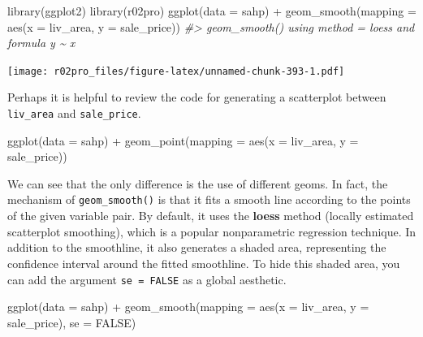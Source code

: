 \documentclass[
]{book}
\newenvironment{Shaded}{\begin{snugshade}}{\end{snugshade}}
\newcommand{\AttributeTok}[1]{\textcolor[rgb]{0.77,0.63,0.00}{#1}}
\newcommand{\CommentTok}[1]{\textcolor[rgb]{0.56,0.35,0.01}{\textit{#1}}}
\newcommand{\ConstantTok}[1]{\textcolor[rgb]{0.00,0.00,0.00}{#1}}
\newcommand{\FunctionTok}[1]{\textcolor[rgb]{0.00,0.00,0.00}{#1}}
\newcommand{\NormalTok}[1]{#1}
\newcommand{\SpecialCharTok}[1]{\textcolor[rgb]{0.00,0.00,0.00}{#1}}
\begin{document}
\begin{Shaded}
\begin{Highlighting}[]
\FunctionTok{library}\NormalTok{(ggplot2)}
\FunctionTok{library}\NormalTok{(r02pro)}
\FunctionTok{ggplot}\NormalTok{(}\AttributeTok{data =}\NormalTok{ sahp) }\SpecialCharTok{+} \FunctionTok{geom\_smooth}\NormalTok{(}\AttributeTok{mapping =} \FunctionTok{aes}\NormalTok{(}\AttributeTok{x =}\NormalTok{ liv\_area, }\AttributeTok{y =}\NormalTok{ sale\_price))}
\CommentTok{\#\textgreater{} \textasciigrave{}geom\_smooth()\textasciigrave{} using method = \textquotesingle{}loess\textquotesingle{} and formula \textquotesingle{}y \textasciitilde{} x\textquotesingle{}}
\end{Highlighting}
\end{Shaded}

\texttt{[image: r02pro\_files/figure-latex/unnamed-chunk-393-1.pdf]}

Perhaps it is helpful to review the code for generating a scatterplot between \texttt{liv\_area} and \texttt{sale\_price}.

\begin{Shaded}
\begin{Highlighting}[]
\FunctionTok{ggplot}\NormalTok{(}\AttributeTok{data =}\NormalTok{ sahp) }\SpecialCharTok{+} \FunctionTok{geom\_point}\NormalTok{(}\AttributeTok{mapping =} \FunctionTok{aes}\NormalTok{(}\AttributeTok{x =}\NormalTok{ liv\_area, }\AttributeTok{y =}\NormalTok{ sale\_price))}
\end{Highlighting}
\end{Shaded}

We can see that the only difference is the use of different geoms. In fact, the mechanism of \texttt{geom\_smooth()} is that it fits a smooth line according to the points of the given variable pair. By default, it uses the \textbf{loess} method (locally estimated scatterplot smoothing), which is a popular nonparametric regression technique. In addition to the smoothline, it also generates a shaded area, representing the confidence interval around the fitted smoothline. To hide this shaded area, you can add the argument \texttt{se\ =\ FALSE} as a global aesthetic.

\begin{Shaded}
\begin{Highlighting}[]
\FunctionTok{ggplot}\NormalTok{(}\AttributeTok{data =}\NormalTok{ sahp) }\SpecialCharTok{+} \FunctionTok{geom\_smooth}\NormalTok{(}\AttributeTok{mapping =} \FunctionTok{aes}\NormalTok{(}\AttributeTok{x =}\NormalTok{ liv\_area, }\AttributeTok{y =}\NormalTok{ sale\_price), }\AttributeTok{se =} \ConstantTok{FALSE}\NormalTok{)}
\end{Highlighting}
\end{Shaded}
\end{document}
